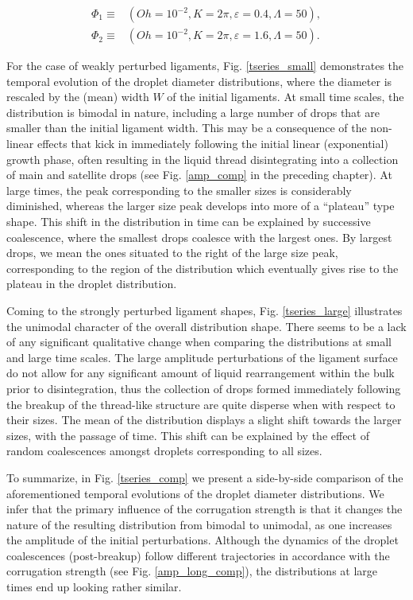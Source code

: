 \begin{align}
	\Phi_1 \equiv & \left( Oh = 10^{-2}, K = 2\pi , \varepsilon = 0.4 , \Lambda = 50 \right) ,  \\
	\Phi_2 \equiv & \left( Oh = 10^{-2}, K = 2\pi , \varepsilon = 1.6 , \Lambda = 50 \right) . 
\end{align}

For the case of weakly perturbed ligaments, Fig. \ref{tseries_small} 
demonstrates the temporal evolution of the droplet diameter distributions, 
where the diameter is rescaled by the (mean) width $W$ of the initial ligaments. 
At small time scales, the distribution is bimodal in nature, including a large
number of drops that are smaller than the initial ligament width. 
This may be a consequence of the non-linear effects \cite{sat_1, sat_2} 
that kick in immediately following the initial linear (exponential) growth phase, 
often resulting in the liquid thread disintegrating into a collection of main 
and satellite drops (see Fig. \ref{amp_comp} in the preceding chapter). 
At large times, the peak corresponding to the smaller sizes is considerably diminished, 
whereas the larger size peak develops into more of a ``plateau'' type shape.  
This shift in the distribution in time can be explained by 
successive coalescence, where the smallest drops coalesce with the largest ones. 
By largest drops, we mean the ones situated to the right of the large size peak, 
corresponding to the region of the distribution which eventually 
gives rise to the plateau in the droplet distribution.


Coming to the strongly perturbed ligament shapes, Fig. \ref{tseries_large} illustrates 
the unimodal character of the overall distribution shape.
There seems to be a lack of any significant qualitative change 
when comparing the distributions at small and large time scales. 
The large amplitude perturbations of the ligament surface do not 
allow for any significant amount of liquid rearrangement within the bulk prior 
to disintegration, thus the collection of drops formed immediately following the breakup
of the thread-like structure are quite disperse when with respect to their sizes.
The mean of the distribution displays a slight shift towards the larger sizes, with the passage of time. 
This shift can be explained by the effect of random coalescences amongst droplets corresponding to all sizes.

To summarize, in Fig. \ref{tseries_comp} we present a side-by-side comparison of 
the aforementioned temporal evolutions of the droplet diameter distributions.  
We infer that the primary influence of the corrugation strength 
is that it changes the nature of the resulting distribution from bimodal to unimodal,
as one increases the amplitude of the initial perturbations. 
Although the dynamics of the droplet coalescences (post-breakup) follow different trajectories
in accordance with the corrugation strength (see Fig. \ref{amp_long_comp}), 
the distributions at large times end up looking rather similar.

